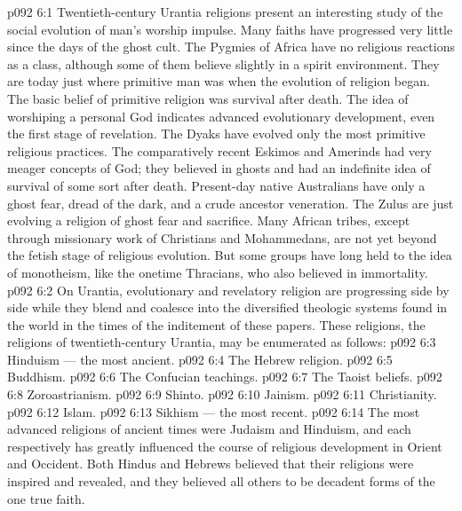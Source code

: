 \vs p092 6:1 Twentieth\hyp{}century Urantia religions present an interesting study of the social evolution of man’s worship impulse. Many faiths have progressed very little since the days of the ghost cult. The Pygmies of Africa have no religious reactions as a class, although some of them believe slightly in a spirit environment. They are today just where primitive man was when the evolution of religion began. The basic belief of primitive religion was survival after death. The idea of worshiping a personal God indicates advanced evolutionary development, even the first stage of revelation. The Dyaks have evolved only the most primitive religious practices. The comparatively recent Eskimos and Amerinds had very meager concepts of God; they believed in ghosts and had an indefinite idea of survival of some sort after death. Present\hyp{}day native Australians have only a ghost fear, dread of the dark, and a crude ancestor veneration. The Zulus are just evolving a religion of ghost fear and sacrifice. Many African tribes, except through missionary work of Christians and Mohammedans, are not yet beyond the fetish stage of religious evolution. But some groups have long held to the idea of monotheism, like the onetime Thracians, who also believed in immortality.
\vs p092 6:2 \pc On Urantia, evolutionary and revelatory religion are progressing side by side while they blend and coalesce into the diversified theologic systems found in the world in the times of the inditement of these papers. These religions, the religions of twentieth\hyp{}century Urantia, may be enumerated as follows:
\vs p092 6:3 \bibnobreakspace Hinduism --- the most ancient.
\vs p092 6:4 \bibnobreakspace The Hebrew religion.
\vs p092 6:5 \bibnobreakspace Buddhism.
\vs p092 6:6 \bibnobreakspace The Confucian teachings.
\vs p092 6:7 \bibnobreakspace The Taoist beliefs.
\vs p092 6:8 \bibnobreakspace Zoroastrianism.
\vs p092 6:9 \bibnobreakspace Shinto.
\vs p092 6:10 \bibnobreakspace Jainism.
\vs p092 6:11 \bibnobreakspace Christianity.
\vs p092 6:12 \bibnobreakspace Islam.
\vs p092 6:13 \bibnobreakspace Sikhism --- the most recent.
\vs p092 6:14 \pc The most advanced religions of ancient times were Judaism and Hinduism, and each respectively has greatly influenced the course of religious development in Orient and Occident. Both Hindus and Hebrews believed that their religions were inspired and revealed, and they believed all others to be decadent forms of the one true faith.
